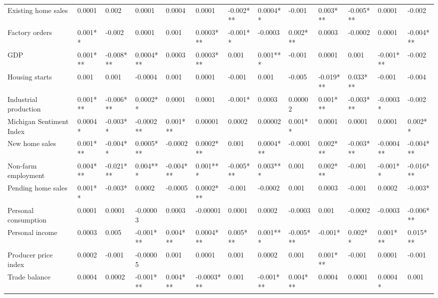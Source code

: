\begin{landscape}
\begin{table}[]
{\begin{tabular}{lllllllllllll}
Existing home sales      & 0.0001   & 0.002     & 0.0001    & 0.0004    & 0.0001     & -0.002*** & 0.0004**  & -0.001    & 0.003***  & -0.005*** & 0.0001    & -0.002    \\
Factory orders           & 0.001**  & -0.002    & 0.0001    & 0.001     & 0.0003***  & -0.001**  & -0.0003   & 0.002***  & 0.0003    & -0.0002   & 0.0001    & -0.004*** \\
GDP                      & 0.001*** & -0.008*** & 0.0004*** & 0.0003    & 0.0003***  & 0.001     & 0.001***  & -0.001    & 0.0001    & 0.001     & -0.001*** & -0.002    \\
Housing starts           & 0.001    & 0.001     & -0.0004   & 0.001     & 0.0001     & -0.001    & 0.001     & -0.005    & -0.019*** & 0.033***  & -0.001    & -0.004    \\
Industrial production    & 0.001*** & -0.006*** & 0.0002**  & 0.0001    & 0.0001     & -0.001*   & 0.0003    & 0.00002   & 0.001***  & -0.003*** & -0.0003*  & -0.002    \\
Michigan Sentiment Index & 0.0004*  & -0.003**  & -0.0002** & 0.001***  & 0.00001    & 0.0002    & 0.00002   & 0.001**   & 0.0001    & 0.0001    & 0.0001    & 0.002**   \\
New home sales           & 0.001*** & -0.004**  & 0.0005*** & -0.0002   & 0.0002***  & 0.001     & 0.0004*** & -0.0001   & 0.002***  & -0.003*** & -0.0004** & -0.004*** \\
Non-farm employment      & 0.004*** & -0.021*** & 0.004***  & -0.004*** & 0.001***   & -0.005*** & 0.003***  & 0.001     & 0.002***  & -0.001    & -0.001**  & -0.016*** \\
Pending home sales       & 0.001**  & -0.003*   & 0.0002    & -0.0005   & 0.0002***  & -0.001    & -0.0002   & 0.001     & 0.0003    & -0.001    & 0.0002    & -0.003*   \\
Personal consumption     & 0.0001   & 0.0001    & -0.00003  & 0.0003    & -0.00001   & 0.0001    & 0.0002    & -0.0003   & 0.001     & -0.0002   & -0.0003   & -0.006*** \\
Personal income          & 0.0003   & 0.005     & -0.001*** & 0.004***  & 0.0004***  & 0.005***  & 0.001***  & -0.005*** & -0.001*   & 0.002**   & 0.001***  & 0.015***  \\
Producer price index     & 0.0002   & -0.001    & -0.00005  & 0.001     & 0.0001     & 0.001     & 0.0002    & 0.001     & 0.001***  & -0.001    & 0.0001    & -0.001    \\
Trade balance            & 0.0004   & 0.0002    & -0.001*** & 0.004***  & -0.0003*** & 0.001     & -0.001*** & 0.004***  & 0.0004    & 0.0001    & 0.0004*   & 0.001     \\ \hline

\end{tabular}}
\end{table}
\end{landscape}

